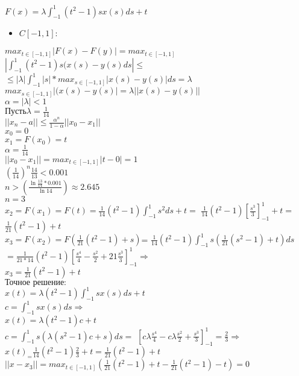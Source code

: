 \documentclass[oneside, final, 11pt]{article}
\begin{document}
  $F(x) = \lambda \int_{-1}^1(t^2-1)sx(s) ds+t $
 \begin{itemize} \item $C[-1,1]:$ \end{itemize} 
  ${max}_{t\in[-1,1]} |F(x)-F(y)| = {max}_{t\in[-1,1]}$ $\left|\int_{-1}^1(t^2-1)s(x(s)-y(s) ds\right| \leq $\\
 $ \leq |\lambda| \int_{-1}^1|s|*{max}_{s\in[-1,1]}|x(s)-y(s)| ds = \lambda$ ${max}_{s\in[-1,1]}|(x(s)-y(s)| = \lambda ||x(s)-y(s)||$ \\
 $ \alpha = |\lambda| < 1$ \\
  $\text{Пусть} \lambda = \frac{1}{14}$ \\
  $||x_n - a|| \leq \frac{\alpha^n}{1-\alpha}||x_0 - x_1|| $\\
  $x_0 = 0 $\\
  $x_1 = F(x_0) = t$ \\
  $\alpha = \frac{1}{14}$\\
 $ ||x_0 - x_1|| = {max}_{t\in[-1,1]}|t-0| = 1$ \\
 $ \left(\frac{1}{14}\right)^n\frac{14}{13} < 0.001$ \\
  $n > \left(\frac{\ln{\frac{13}{14}*0.001}}{\ln{14}}\right) \approx 2.645 $\\
  $n = 3$ \\
 $ x_2 = F(x_1) = F(t) = \frac{1}{14}(t^2-1)\int_{-1}^1 s^2 ds +t =$ $\frac{1}{14}(t^2-1) \left[\frac{s^3}{3}\right]_{-1}^1 +t =$ $\frac{1}{21}(t^2-1)+t$\\
  $x_3 = F(x_2) = F\left(\frac{1}{21}(t^2-1)+s\right) $= $\frac{1}{14}(t^2-1)\int_{-1}^1 s\left(\frac{1}{21}(s^2-1)+t\right) ds$ $= \frac{1}{21*14}(t^2-1)\left[\frac{s^4}{4}-\frac{s^2}{2}+21\frac{s^3}{3}\right]_{-1}^1 \Rightarrow$\\
  $x_3 = \frac{1}{21}(t^2-1)+t$\\
    $\text{Точное решение:}$\\
  $x(t) = \lambda(t^2-1) \int_{-1}^1sx(s) ds+t$ \\
  $c = \int_{-1}^1sx(s) ds \Rightarrow $\\
  $x(t) =  \lambda(t^2-1)c+t $\\
  $c = \int_{-1}^1s\left(\lambda(s^2-1)c+s\right)ds =$ $\left[c\lambda\frac{s^4}{4}-c\lambda\frac{s^2}{2}+\frac{s^3}{3}\right]_{-1}^1 = \frac{2}{3} \Rightarrow $\\
  $x(t)_ = \frac{1}{14}(t^2-1)\frac{2}{3}+t = \frac{1}{21}(t^2-1)+t$\\
  $||x-x_3|| = {max}_{t\in[-1,1]}\left(\frac{1}{21}(t^2-1)+t-\frac{1}{21}(t^2-1)-t\right)=0$\\
\end{document}
